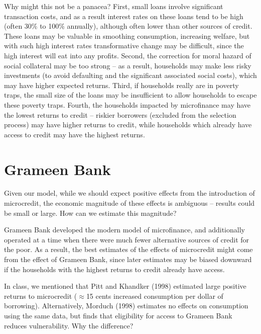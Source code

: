 \documentclass[12pt,english]{article}
\begin{document}
Why might this not be a panacea? First, small loans involve significant transaction costs, and as a result interest rates on these loans tend to be high (often 30\% to 100\% annually), although often lower than other sources of credit. These loans may be valuable in smoothing consumption, increasing welfare, but with such high interest rates transformative change may be difficult, since the high interest will eat into any profits. Second, the correction for moral hazard of social collateral may be too strong -- as a result, households may make less risky investments (to avoid defaulting and the significant associated social costs), which may have higher expected returns. Third, if households really are in poverty traps, the small size of the loans may be insufficient to allow households to escape these poverty traps. Fourth, the households impacted by microfinance may have the lowest returns to credit -- riskier borrowers (excluded from the selection process) may have higher returns to credit, while households which already have access to credit may have the highest returns.

\section{Grameen Bank}

Given our model, while we should expect positive effects from the introduction of microcredit, the economic magnitude of these effects is ambiguous -- results could be small or large. How can we estimate this magnitude?

Grameen Bank developed the modern model of microfinance, and additionally operated at a time when there were much fewer alternative sources of credit for the poor. As a result, the best estimates of the effects of microcredit might come from the effect of Grameen Bank, since later estimates may be biased downward if the households with the highest returns to credit already have access.

In class, we mentioned that Pitt and Khandker (1998) estimated large positive returns to microcredit ($\approx$15 cents increased consumption per dollar of borrowing). Alternatively, Morduch (1998) estimates no effects on consumption using the same data, but finds that eligibility for access to Grameen Bank reduces vulnerability. Why the difference?
\end{document}
